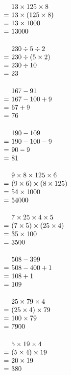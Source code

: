 \documentclass[UTF8]{ctexart}
\makeatletter
\newcommand{\cell}[2]{%
  \begin{minipage}[t][35mm][t]{0.315\textwidth}%
    \vspace{0pt}\linespread{1}#1\selectfont
    \strut#2%
  \end{minipage}%
}
\newcommand{\arow}[3]{%
  \noindent\cell{\zihao{-4}}{#1}\hfill
  \cell{\zihao{-4}}{#2}\hfill
  \cell{\zihao{-4}}{#3}\par\nointerlineskip
}
\newcommand{\eqgap}{0.35em}
\newcommand{\problemline}[1]{#1}
\newcommand{\solution}[1]{%
  \(\begin{array}[t]{@{}r@{\hspace{\eqgap}}l@{}}#1\end{array}\)%
}
\makeatother
\begin{document}
\arow
{\solution{
& \problemline{13\times 125\times 8} \\
= & 13\times (125\times 8) \\
= & 13\times 1000 \\
= & 13000
}}
{\solution{
& \problemline{230\div 5\div 2} \\
= & 230\div (5\times 2) \\
= & 230\div 10 \\
= & 23
}}
{\solution{
& \problemline{167-91} \\
= & 167-100+9 \\
= & 67+9 \\
= & 76
}}
\arow
{\solution{
& \problemline{190-109} \\
= & 190-100-9 \\
= & 90-9 \\
= & 81
}}
{\solution{
& \problemline{9\times 8\times 125\times 6} \\
= & (9\times 6)\times (8\times 125) \\
= & 54\times 1000 \\
= & 54000
}}
{\solution{
& \problemline{7\times 25\times 4\times 5} \\
= & (7\times 5)\times (25\times 4) \\
= & 35\times 100 \\
= & 3500
}}
\arow
{\solution{
& \problemline{508-399} \\
= & 508-400+1 \\
= & 108+1 \\
= & 109
}}
{\solution{
& \problemline{25\times 79\times 4} \\
= & (25\times 4)\times 79 \\
= & 100\times 79 \\
= & 7900
}}
{\solution{
& \problemline{5\times 19\times 4} \\
= & (5\times 4)\times 19 \\
= & 20\times 19 \\
= & 380
}}

\newpage
\end{document}
